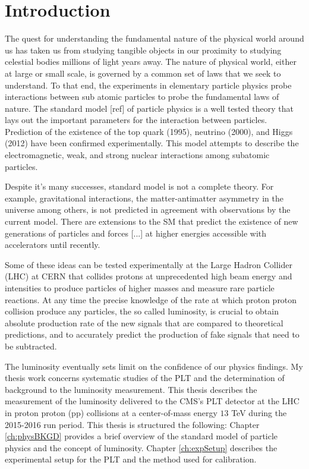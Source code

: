 \chapter{Introduction} \label{ch:Introduction}

The quest for understanding the fundamental nature of the physical world around us has taken us from studying tangible objects in our proximity to studying celestial bodies millions of light years away. The nature of physical world, either at large or small scale, is governed by a common set of laws that we seek to understand. To that end, the experiments in elementary particle physics probe interactions between sub atomic particles to probe the fundamental laws of nature. The standard model [ref] of particle physics is a well tested theory that lays out the important parameters for the interaction between particles. Prediction of the existence of the top quark (1995), neutrino (2000), and Higgs (2012) have been confirmed experimentally. This model attempts to describe the electromagnetic, weak, and strong nuclear interactions among subatomic particles.%

Despite it's many successes, standard model is not a complete theory. For example, gravitational interactions, the matter-antimatter asymmetry in the universe among others, is not predicted in agreement with observations by the current model. There are extensions to the SM that predict the existence of new generations of particles and forces [...] at higher energies accessible with accelerators until recently. 

Some of these ideas can be tested experimentally at the Large Hadron Collider (LHC) at CERN that collides protons at unprecedented high beam energy and intensities to produce particles of higher masses and measure rare particle reactions. At any time the precise knowledge of the rate at which proton proton collision produce any particles, the so called luminosity, is crucial to obtain absolute production rate of the new signals that are compared to theoretical predictions, and to accurately predict the production of fake signals that need to be subtracted.

The luminosity eventually sets limit on the confidence of our physics findings. My thesis work concerns systematic studies of the PLT and the determination of background to the luminosity measurement.
This thesis describes the measurement of the luminosity delivered to the CMS's PLT detector at the LHC in proton proton (pp) collisions at a center-of-mass energy $13$ TeV during the 2015-2016 run period. This thesis is structured the following: Chapter \ref{ch:physBKGD} provides a brief overview of the standard model of particle physics and the concept of luminosity. Chapter \ref{ch:expSetup} describes the experimental setup for the PLT and the method used for calibration.

